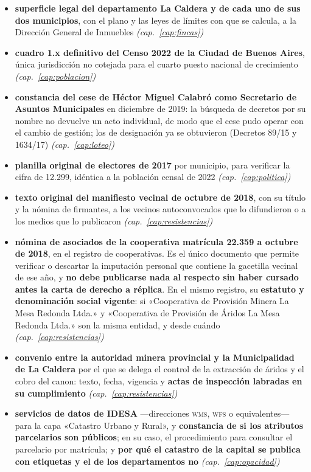 \begin{itemize}[leftmargin=*]
\item \textbf{superficie legal del departamento La Caldera y de cada uno de sus dos municipios}, con el plano y las leyes de límites con que se calcula, a la Dirección General de Inmuebles \textit{(cap.\ \ref{cap:fincas})}
\item \textbf{cuadro 1.x definitivo del Censo 2022 de la Ciudad de Buenos Aires}, única jurisdicción no cotejada para el cuarto puesto nacional de crecimiento \textit{(cap.\ \ref{cap:poblacion})}
\item \textbf{constancia del cese de Héctor Miguel Calabró como Secretario de Asuntos Municipales} en diciembre de 2019: la búsqueda de decretos por su nombre no devuelve un acto individual, de modo que el cese pudo operar con el cambio de gestión; los de designación ya se obtuvieron (Decretos 89/15 y 1634/17) \textit{(cap.\ \ref{cap:loteo})}
\item \textbf{planilla original de electores de 2017} por municipio, para verificar la cifra de 12.299, idéntica a la población censal de 2022 \textit{(cap.\ \ref{cap:politica})}
\item \textbf{texto original del manifiesto vecinal de octubre de 2018}, con su título y la nómina de firmantes, a los vecinos autoconvocados que lo difundieron o a los medios que lo publicaron \textit{(cap.\ \ref{cap:resistencias})}
\item \textbf{nómina de asociados de la cooperativa matrícula 22.359 a octubre de 2018}, en el registro de cooperativas. Es el único documento que permite verificar o descartar la imputación personal que contiene la gacetilla vecinal de ese año, y \textbf{no debe publicarse nada al respecto sin haber cursado antes la carta de derecho a réplica}. En el mismo registro, su \textbf{estatuto y denominación social vigente}: si «Cooperativa de Provisión Minera La Mesa Redonda Ltda.» y «Cooperativa de Provisión de Áridos La Mesa Redonda Ltda.» son la misma entidad, y desde cuándo \textit{(cap.\ \ref{cap:resistencias})}
\item \textbf{convenio entre la autoridad minera provincial y la Municipalidad de La Caldera} por el que se delega el control de la extracción de áridos y el cobro del canon: texto, fecha, vigencia y \textbf{actas de inspección labradas en su cumplimiento} \textit{(cap.\ \ref{cap:resistencias})}
\item \textbf{servicios de datos de IDESA} ---direcciones \textsc{wms}, \textsc{wfs} o equivalentes--- para la capa «Catastro Urbano y Rural», y \textbf{constancia de si los atributos parcelarios son públicos}; en su caso, el procedimiento para consultar el parcelario por matrícula; y \textbf{por qué el catastro de la capital se publica con etiquetas y el de los departamentos no} \textit{(cap.\ \ref{cap:opacidad})}

\end{itemize}
